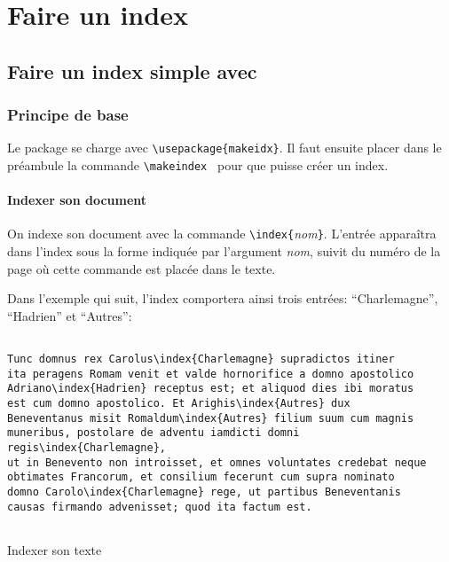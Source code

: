 
\chapter{Faire un index}


\section{Faire un index simple avec }


\subsection{Principe de base}
\begin{prealable}
Le package se charge avec \verb|\usepackage{makeidx}|. Il faut ensuite placer dans le préambule la commande \verb|\makeindex | pour que \latex  puisse créer un index.
\end{prealable}



\subsubsection{Indexer son document}


On indexe son document avec  la commande \verb+\index{+\emph{nom}\verb+}+. L'entrée apparaîtra dans l'index sous la forme indiquée par l'argument \emph{nom}, suivit du numéro de la page où cette commande est placée dans le texte. 

Dans l'exemple qui suit, l'index comportera ainsi trois entrées: \enquote{Charlemagne}, \enquote{Hadrien} et \enquote{Autres}:

\begin{listing}[ht]
\begin{verbatim}

Tunc domnus rex Carolus\index{Charlemagne} supradictos itiner 
ita peragens Romam venit et valde hornorifice a domno apostolico
Adriano\index{Hadrien} receptus est; et aliquod dies ibi moratus
est cum domno apostolico. Et Arighis\index{Autres} dux
Beneventanus misit Romaldum\index{Autres} filium suum cum magnis
muneribus, postolare de adventu iamdicti domni regis\index{Charlemagne},
ut in Benevento non introisset, et omnes voluntates credebat neque 
obtimates Francorum, et consilium fecerunt cum supra nominato 
domno Carolo\index{Charlemagne} rege, ut partibus Beneventanis
causas firmando advenisset; quod ita factum est. 


\end{verbatim}
\caption{Indexer son texte}
\end{listing}

